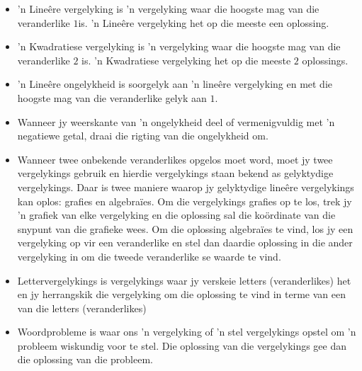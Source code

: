 \begin{itemize}[noitemsep]
\item ’n Lineêre vergelyking is ’n vergelyking waar die hoogste mag van die veranderlike $1$is. ’n Lineêre vergelyking het op die meeste een oplossing.
\item ’n Kwadratiese vergelyking is ’n vergelyking waar die hoogste mag van die veranderlike $2$ is. ’n Kwadratiese
vergelyking het op die meeste $2$ oplossings.
\item ’n Lineêre ongelykheid is soorgelyk aan ’n lineêre vergelyking en met die hoogste mag van die veranderlike
gelyk aan $1$.
\item Wanneer jy weerskante van ’n ongelykheid deel of vermenigvuldig met ’n negatiewe getal,
draai die rigting van die ongelykheid om. 
\item Wanneer twee onbekende veranderlikes opgelos moet word, moet jy twee vergelykings gebruik en hierdie vergelykings staan bekend as gelyktydige vergelykings. Daar is twee maniere waarop jy gelyktydige lineêre
vergelykings kan oplos: grafies en algebraïes. Om die vergelykings grafies op te los, trek jy ’n grafiek
van elke vergelyking en die oplossing sal die koördinate van die snypunt van die grafieke wees. Om die
oplossing algebraïes te vind, los jy een vergelyking op vir een veranderlike en stel dan daardie oplossing
in die ander vergelyking in om die tweede veranderlike se waarde te vind.
\item Lettervergelykings is vergelykings waar jy verskeie letters (veranderlikes) het en jy herrangskik die vergelyking om die oplossing te vind in terme van een van die letters (veranderlikes)
\item Woordprobleme is waar ons ’n vergelyking of ’n stel vergelykings opstel om ’n probleem wiskundig
voor te stel. Die oplossing van die vergelykings gee dan die oplossing van die probleem.
\end{itemize}

